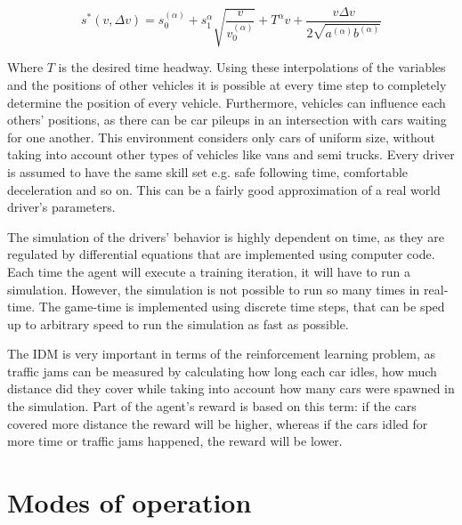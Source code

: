 \documentclass[
]{elteikthesis}[2023/04/10]
\begin{document}
\begin{equation}
s^{*}(v,\Delta v)=s_{0}^{(\alpha)}+s_{1}^{\alpha}\sqrt{\frac{v}{v_{0}^{(\alpha)}}}+T^{\alpha}v+\frac{v\Delta v}{2\sqrt{a^{(\alpha)}b^{(\alpha)}}}
\end{equation}

Where $T$ is the desired time headway. Using these interpolations
of the variables and the positions of other vehicles it is possible
at every time step to completely determine the position of every vehicle.
Furthermore, vehicles can influence each others' positions, as there
can be car pileups in an intersection with cars waiting for one another.
This environment considers only cars of uniform size, without taking
into account other types of vehicles like vans and semi trucks. Every
driver is assumed to have the same skill set e.g. safe following time,
comfortable deceleration and so on. This can be a fairly good approximation
of a real world driver's parameters. 

The simulation of the drivers' behavior is highly dependent on time,
as they are regulated by differential equations that are implemented
using computer code. Each time the agent will execute a training iteration,
it will have to run a simulation. However, the simulation is not possible
to run so many times in real-time. The game-time is implemented using
discrete time steps, that can be sped up to arbitrary speed to run
the simulation as fast as possible. 

The IDM is very important in terms of the reinforcement learning problem,
as traffic jams can be measured by calculating how long each car idles,
how much distance did they cover while taking into account how many
cars were spawned in the simulation. Part of the agent's reward is
based on this term: if the cars covered more distance the reward will
be higher, whereas if the cars idled for more time or traffic jams
happened, the reward will be lower.

\section{Modes of operation}
\end{document}
